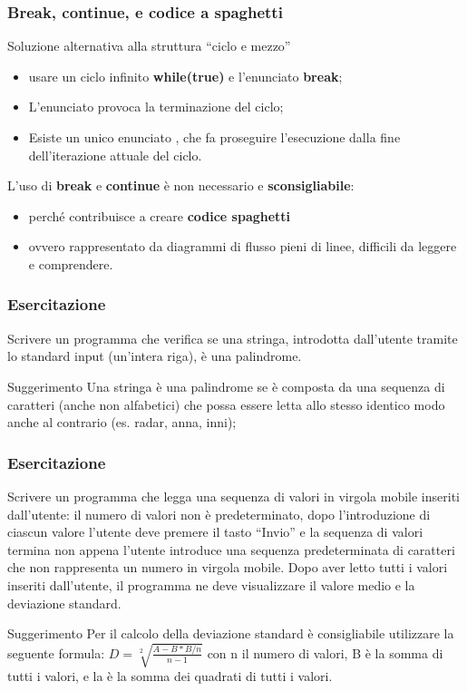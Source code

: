 \begin{frame}
\frametitle{Break, continue, e codice a spaghetti}
\begin{block}{}
Soluzione alternativa alla struttura ``ciclo e mezzo''
\begin{itemize}
\item usare un ciclo infinito \textbf{while(true)} e l'enunciato \textbf{break};
\item L'enunciato \textbf{} provoca la terminazione del ciclo;
\item Esiste un unico enunciato \textbf{}, che fa proseguire l'esecuzione dalla fine dell'iterazione
attuale del ciclo.
\end{itemize}
\end{block}
\begin{block}{}
L'uso di \textbf{break} e \textbf{continue} è non necessario e \textbf{\alert{sconsigliabile}}:
\begin{itemize}
\item perché contribuisce a creare \textbf{\alert{codice spaghetti}}
\item ovvero rappresentato da diagrammi di flusso pieni di linee, difficili da leggere e comprendere.
\end{itemize}
\end{block}
\end{frame}

\begin{frame}
\frametitle{Esercitazione}
\begin{block}{1}
Scrivere un programma che verifica se una stringa, introdotta dall'utente tramite lo standard input (un'intera riga), è una palindrome.
\end{block}
\begin{block}{Suggerimento}
Una stringa è una palindrome se è composta da una sequenza di caratteri (anche non alfabetici) che possa essere letta
allo stesso identico modo anche al contrario (es. radar, anna, inni);
\end{block}
\end{frame}

\begin{frame}
\frametitle{Esercitazione}
\begin{block}{2}
Scrivere un programma che legga una sequenza di valori in virgola mobile inseriti dall'utente: il numero di valori non è predeterminato, dopo l'introduzione di ciascun valore l'utente deve premere il tasto ``Invio'' e la sequenza di valori termina non appena l'utente introduce una sequenza predeterminata di caratteri che non rappresenta un numero in virgola mobile.
Dopo aver letto tutti i valori inseriti dall'utente, il programma ne deve visualizzare il valore medio e la deviazione standard.
\end{block}
\begin{block}{Suggerimento}
Per il calcolo della deviazione standard è consigliabile utilizzare la seguente formula: $D =\sqrt[2]{\frac{A - B*B/n}{n-1}} $
con n il numero di valori, B è la somma di tutti i valori, e la è la somma dei quadrati di tutti i valori. 
\end{block}
\end{frame}

